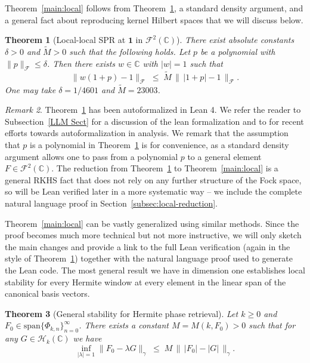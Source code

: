 \documentclass[11pt]{amsart}
\newtheorem{theorem}{Theorem}[section]
\theoremstyle{remark}
\newtheorem{remark}[theorem]{Remark}
\begin{document}
Theorem~\ref{main:local} follows from Theorem~\ref{thm:local}, a standard density argument, and a general fact about reproducing kernel Hilbert spaces that we will discuss below. 
\begin{theorem}[Local-local SPR at $\mathbf{1}$ in $\mathcal{F}^2(\mathbb{C})$]\label{thm:local}
There exist absolute constants $\delta > 0$ and $\widetilde{M} > 0$ such
that the following holds.  Let $p$ be a polynomial with
$\lVert p \rVert_\mathcal{F} \le \delta$.  Then there exists $w \in \mathbb{C}$ with $\lvert w \rvert = 1$
such that
\[
\lVert w(1+p) - 1 \rVert_\mathcal{F}
\;\le\;
\widetilde{M}\,
\bigl\|\, \lvert 1+p \rvert - 1 \,\bigr\|_{\mathcal{F}}.
\]
One may take $\delta = 1/4601$ and $\widetilde{M} = 23003$.
\end{theorem}
\begin{remark}
    Theorem~\ref{thm:local} has been autoformalized in Lean 4.  We refer the reader to Subsection~\ref{LLM Sect} for a discussion of the lean formalization and to \cite{armstrong2026formalization} for recent efforts towards autoformalization in analysis. We remark that the assumption that $p$ is a polynomial in Theorem~\ref{thm:local} is for convenience, as a standard density argument allows one to pass from a polynomial $p$ to a general element $F\in \mathcal{F}^2(\mathbb{C})$. The reduction from Theorem~\ref{thm:local} to Theorem~\ref{main:local} is a general RKHS fact that does not rely on any further structure of the Fock space, so will be Lean verified later in a more systematic way -- we include the complete natural language proof in Section~\ref{subsec:local-reduction}.
\end{remark}

Theorem~\ref{main:local} can be vastly generalized using similar methods. Since the proof becomes much more technical but not more instructive, we will only sketch the main changes and provide a link to the full Lean verification (again in the style of Theorem~\ref{thm:local}) together with the natural language proof used to generate the Lean code. The most general result we have in dimension one establishes local stability for every Hermite window at every element in the linear span of the canonical basis vectors.
\begin{theorem}[General stability for Hermite phase retrieval]\label{thm:local_Gen}
Let $k\geq 0$ and $F_0\in \text{span}\{\Phi_{k,n}\}_{n=0}^\infty$. There exists a constant $M=M(k,F_0)>0$ such
that for any $G\in \mathcal{H}_k(\mathbb{C})$ we have
\[
\inf_{|\lambda|=1}\lVert F_0 - \lambda G \rVert_\gamma
\;\le\;
M\,
\bigl\|\, \lvert F_0 \rvert - |G| \,\bigr\|_{\gamma}.
\]
\end{theorem}
\end{document}
